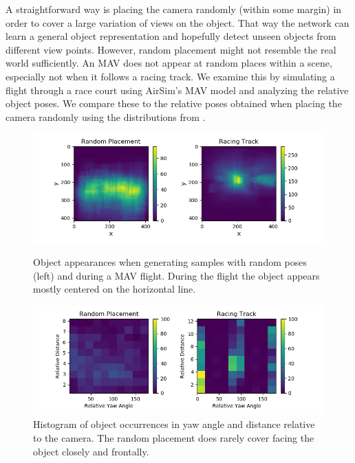 A straightforward way is placing the camera randomly (within some margin) in order to cover a large variation of views on the object. That way the network can learn a general object representation and hopefully detect unseen objects from different view points. However, random  placement might not resemble the real world sufficiently. An \ac{MAV} does not appear at random places within a scene, especially not when it follows a racing track. We examine this by simulating a flight through a race court using AirSim's \ac{MAV} model and analyzing the relative object poses. We compare these to the relative poses obtained when placing the camera randomly using the distributions from .

\begin{figure}
	\begin{minipage}{\textwidth}
		\includegraphics[width=\textwidth]{fig/heatmap_camplace}
		\caption{Object appearances when generating samples with random poses (left) and during a \ac{MAV} flight. During the flight the object appears mostly centered on the horizontal line.}
		\label{fig:heatmap_camplace}
	\end{minipage}
	\begin{minipage}{\textwidth}
		\includegraphics[width=\textwidth]{fig/hist2d_camplace}
		\caption{Histogram of object occurrences in yaw angle and distance relative to the camera. The random placement does rarely cover facing the object closely and frontally. }
		\label{fig:hist2d_camplace}
	\end{minipage}
\end{figure}

